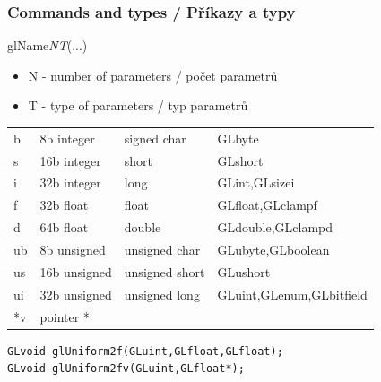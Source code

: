 \begin{frame}[fragile]\frametitle{Commands and types / Příkazy a typy}
  glName{\it NT}(...)
  \begin{itemize}
    \item N - number of parameters / počet parametrů
    \item T - type of parameters / typ parametrů
  \end{itemize}
    \begin{tabular}{l|l|l|l}
    b & 8b integer & signed char & GLbyte \\ 
    s & 16b integer & short & GLshort \\ 
    i & 32b integer & long & GLint,GLsizei \\ 
    f & 32b float & float & GLfloat,GLclampf \\ 
    d & 64b float & double & GLdouble,GLclampd \\ 
    ub & 8b unsigned & unsigned char & GLubyte,GLboolean \\ 
    us & 16b unsigned & unsigned short & GLushort \\ 
    ui & 32b unsigned & unsigned long & GLuint,GLenum,GLbitfield \\ 
    *v & pointer * & & \\
    \end{tabular}
\begin{verbatim}
GLvoid glUniform2f(GLuint,GLfloat,GLfloat);
GLvoid glUniform2fv(GLuint,GLfloat*);
\end{verbatim}
\end{frame}

